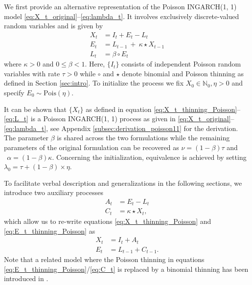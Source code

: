 \documentclass{article}
\begin{document}
We first provide an alternative representation of the Poisson INGARCH(1, 1) model \eqref{eq:X_t_original}--\eqref{eq:lambda_t}. It involves exclusively discrete-valued random variables and is given by
\begin{align}
X_t & = I_t + E_t - L_t \label{eq:X_t_thinning_Poisson}\\
E_t & = L_{t - 1} \ + \ \kappa \star X_{t - 1}\label{eq:E_t_thinning_Poisson}\\
L_t & = \beta \circ E_t \label{eq:L_t}
\end{align}
where $\kappa > 0$ and $0 \leq \beta < 1$. Here, $\{I_t\}$ consists of independent Poisson random variables with rate $\tau > 0$ while $\circ$ and $\star$ denote binomial and Poisson thinning as defined in Section \ref{sec:intro}. %
To initialize the process we fix $X_0 \in \mathbb{N}_0, \eta > 0$ and specify $E_0 \sim \text{Pois}\left(\eta \right)$.

It can be shown that $\{X_t\}$ as defined in equation \eqref{eq:X_t_thinning_Poisson}--\eqref{eq:L_t} is a Poisson INGARCH(1, 1) process as given in \eqref{eq:X_t_original}--\eqref{eq:lambda_t}, see Appendix \ref{subsec:derivation_poisson11} for the derivation. The parameter $\beta$ is shared across the two formulations while the remaining parameters of the original formulation can be recovered as
$
\nu = (1 - \beta)\tau$ and $ \ \
\alpha = (1 - \beta)\kappa.
$
Concerning the initialization, equivalence is achieved by setting $\lambda_0 = \tau + (1 - \beta) \times \eta$.

To facilitate verbal description and generalizations in the following sections, we introduce two auxiliary processes
\begin{align}
A_t & = E_t - L_t \label{eq:A_t}\\
C_t & = \kappa \star X_t \label{eq:C_t},
\end{align}
which allow us to re-write equations \eqref{eq:X_t_thinning_Poisson} and \eqref{eq:E_t_thinning_Poisson} as
\begin{align}
X_t & = I_t + A_t\label{eq:X_t_v2}\\
E_t & = L_{t - 1} + C_{t - 1}.\label{eq:juv_t_v2}
\end{align}
Note that a related model where the Poisson thinning in equations \eqref{eq:E_t_thinning_Poisson}/\eqref{eq:C_t} is replaced by a binomial thinning has been introduced in \cite{Bracher2019}.
\end{document}
